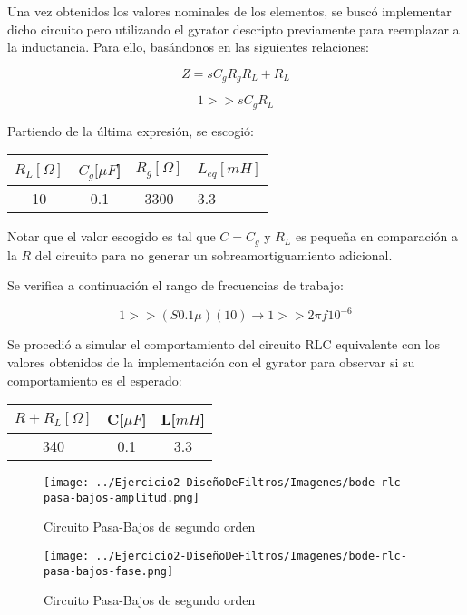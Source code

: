Una vez obtenidos los valores nominales de los elementos, se buscó implementar dicho circuito pero utilizando el gyrator descripto previamente
para reemplazar a la inductancia. Para ello, basándonos 
en las siguientes relaciones:

$$Z=sC_gR_gR_L+R_L$$

$$1 >> sC_gR_L$$

Partiendo de la última expresión, se escogió:

\begin{table}[H]
    \centering
    \begin{tabular}{|c|c|c|l|}
    \hline
    \rowcolor[HTML]{C0C0C0} 
    $R_L[\Omega]$ & $C_g[\mu F$] & $R_g[\Omega]$  & $L_{eq}[mH]$ \\ \hline
     10       & 0.1  & 3300 & 3.3        \\ \hline
    \end{tabular}
    \end{table}


Notar que el valor escogido es tal que $C=C_g$ y $R_L$ es pequeña en comparación a la $R$ del circuito para no generar
un sobreamortiguamiento adicional.

Se verifica a continuación el rango de frecuencias de trabajo:

$$1 >> (S0.1 \mu )(10) \longrightarrow 1  >> 2 \pi f 10^{-6}$$

Se procedió a simular el comportamiento del circuito RLC equivalente con los valores obtenidos de la implementación con el 
gyrator para observar si su comportamiento es el esperado:

\begin{table}[H]
    \centering
    \begin{tabular}{|c|c|c|}
    \hline
    \rowcolor[HTML]{C0C0C0} 
    $R+R_L[\Omega]$ & C[$\mu F$] & L[$mH$]  \\ \hline
    340      & 0.1  & 3.3 \\ \hline
    \end{tabular}
    \end{table}

\begin{figure}[H]
    \centering
    \texttt{[image: ../Ejercicio2-DiseñoDeFiltros/Imagenes/bode-rlc-pasa-bajos-amplitud.png]}
    \caption{Circuito Pasa-Bajos de segundo orden}
\end{figure}

\begin{figure}[H]
    \centering
    \texttt{[image: ../Ejercicio2-DiseñoDeFiltros/Imagenes/bode-rlc-pasa-bajos-fase.png]}
    \caption{Circuito Pasa-Bajos de segundo orden}
\end{figure}

